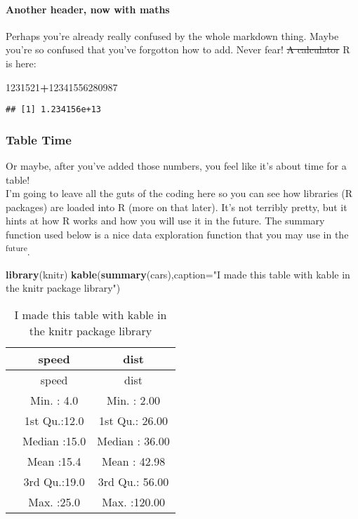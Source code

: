 \documentclass[]{article}
\newenvironment{Shaded}{\begin{snugshade}}{\end{snugshade}}
\newcommand{\KeywordTok}[1]{\textcolor[rgb]{0.13,0.29,0.53}{\textbf{#1}}}
\newcommand{\DataTypeTok}[1]{\textcolor[rgb]{0.13,0.29,0.53}{#1}}
\newcommand{\DecValTok}[1]{\textcolor[rgb]{0.00,0.00,0.81}{#1}}
\newcommand{\StringTok}[1]{\textcolor[rgb]{0.31,0.60,0.02}{#1}}
\newcommand{\OperatorTok}[1]{\textcolor[rgb]{0.81,0.36,0.00}{\textbf{#1}}}
\newcommand{\NormalTok}[1]{#1}
\let\oldparagraph\paragraph
\renewcommand{\paragraph}[1]{\oldparagraph{#1}\mbox{}}
\begin{document}
\paragraph{Another header, now with
maths}\label{another-header-now-with-maths}

Perhaps you're already really confused by the whole markdown thing.
Maybe you're so confused that you've forgotton how to add. Never fear!
\sout{A calculator} R is here:

\begin{Shaded}
\begin{Highlighting}[]
\DecValTok{1231521}\OperatorTok{+}\DecValTok{12341556280987}
\end{Highlighting}
\end{Shaded}

\begin{verbatim}
## [1] 1.234156e+13
\end{verbatim}

\subsubsection{Table Time}\label{table-time}

Or maybe, after you've added those numbers, you feel like it's about
time for a table!\\
I'm going to leave all the guts of the coding here so you can see how
libraries (R packages) are loaded into R (more on that later). It's not
terribly pretty, but it hints at how R works and how you will use it in
the future. The summary function used below is a nice data exploration
function that you may use in the \textsuperscript{future}.

\begin{Shaded}
\begin{Highlighting}[]
\KeywordTok{library}\NormalTok{(knitr)}
\KeywordTok{kable}\NormalTok{(}\KeywordTok{summary}\NormalTok{(cars),}\DataTypeTok{caption=}\StringTok{"I made this table with kable in the knitr package library"}\NormalTok{)}
\end{Highlighting}
\end{Shaded}

\begin{longtable}[]{@{}lcc@{}}
\caption{I made this table with kable in the knitr package
library}\tabularnewline
\toprule
& speed & dist\tabularnewline
\midrule
\endfirsthead
\toprule
& speed & dist\tabularnewline
\midrule
\endhead
& Min. : 4.0 & Min. : 2.00\tabularnewline
& 1st Qu.:12.0 & 1st Qu.: 26.00\tabularnewline
& Median :15.0 & Median : 36.00\tabularnewline
& Mean :15.4 & Mean : 42.98\tabularnewline
& 3rd Qu.:19.0 & 3rd Qu.: 56.00\tabularnewline
& Max. :25.0 & Max. :120.00\tabularnewline
\bottomrule
\end{longtable}
\end{document}
